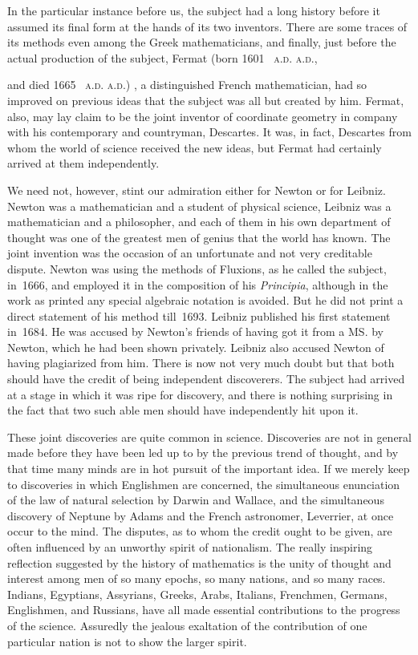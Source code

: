 \documentclass[12pt,leqno]{book}[2005/09/16]
\makeatletter
\newcommand{\PageSep}[1]{\ignorespaces}
\newcommand{\Title}[1]{\textit{#1}}
\newcommand{\SCAbbrev}[3]{%
  \ifthenelse{\equal{#3}{.}}%
  {\textsc{\MakeLowercase{#1.#2}.}}%
  {\textsc{\MakeLowercase{#1.#2}.}\@#3}%
}
\newcommand{\AD}[1]{\SCAbbrev{A}{D}{#1}}
\makeatother
\begin{document}
In the particular instance before us, the
%
%
subject had a long history before it assumed
its final form at the hands of its
two inventors. There are some traces of its
methods even among the Greek mathematicians,
and finally, just before the actual
production of the subject, Fermat (born 1601~\AD,
%
and died 1665~\AD), a distinguished
French mathematician, had so improved on
previous ideas that the subject was all but
created by him. Fermat, also, may lay
claim to be the joint inventor of coordinate
geometry in company with his contemporary
and countryman, Descartes. It was, in fact,
%
Descartes from whom the world of science
received the new ideas, but Fermat had certainly
arrived at them independently.

We need not, however, stint our admiration
either for Newton or for Leibniz. Newton
was a mathematician and a student of
physical science, Leibniz was a mathematician
\PageSep{219}
and a philosopher, and each of them
in his own department of thought was one of
the greatest men of genius that the world
has known. The joint invention was the
occasion of an unfortunate and not very
creditable dispute. Newton was using the
methods of Fluxions, as he called the subject,
%
in~1666, and employed it in the composition
of his \Title{Principia}, although in the work as
printed any special algebraic notation is
avoided. But he did not print a direct statement
of his method till~1693. Leibniz published
his first statement in~1684. He was
accused by Newton's friends of having got
it from a MS. by Newton, which he had been
shown privately. Leibniz also accused Newton
of having plagiarized from him. There
is now not very much doubt but that both
should have the credit of being independent
discoverers. The subject had arrived at a
stage in which it was ripe for discovery, and
there is nothing surprising in the fact that
two such able men should have independently
hit upon it.

These joint discoveries are quite common
in science. Discoveries are not in general
made before they have been led up to
by the previous trend of thought, and by
that time many minds are in hot pursuit
of the important idea. If we merely keep
to discoveries in which Englishmen are
\PageSep{220}
concerned, the simultaneous enunciation of
the law of natural selection by Darwin and
%
Wallace, and the simultaneous discovery of
%
Neptune by Adams and the French astronomer,
%
Leverrier, at once occur to the mind.
%
The disputes, as to whom the credit ought to
be given, are often influenced by an unworthy
spirit of nationalism. The really inspiring
reflection suggested by the history of mathematics
is the unity of thought and interest
among men of so many epochs, so many nations,
and so many races. Indians, Egyptians,
Assyrians, Greeks, Arabs, Italians, Frenchmen,
Germans, Englishmen, and Russians, have
all made essential contributions to the progress
of the science. Assuredly the jealous
exaltation of the contribution of one particular
nation is not to show the larger spirit.
\end{document}
